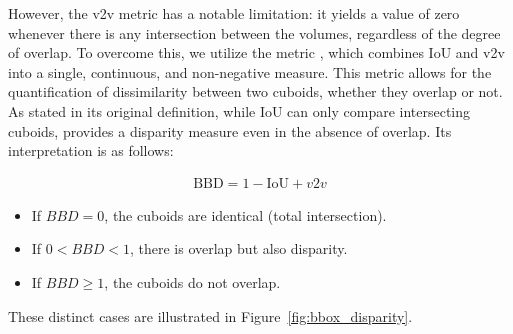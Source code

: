 However, the v2v metric has a notable limitation: it yields a value of zero whenever there is any intersection between the volumes, regardless of the degree of overlap. To overcome this, we utilize the  metric \cite{bounding_box_disparity}, which combines IoU and v2v into a single, continuous, and non-negative measure. This metric allows for the quantification of dissimilarity between two cuboids, whether they overlap or not. As stated in its original definition, while IoU can only compare intersecting cuboids,  provides a disparity measure even in the absence of overlap. Its interpretation is as follows:

\begin{equation}
    \begin{aligned}
    \text{BBD} = 1 - \text{IoU} + v2v
    \end{aligned}
    \label{eq:3d_metrics}
\end{equation}

\begin{itemize}
    \item If $BBD = 0$, the cuboids are identical (total intersection).
    \item If $0 < BBD < 1$, there is overlap but also disparity.
    \item If $BBD \geq 1$, the cuboids do not overlap.
\end{itemize}

These distinct cases are illustrated in Figure~\ref{fig:bbox_disparity}.

